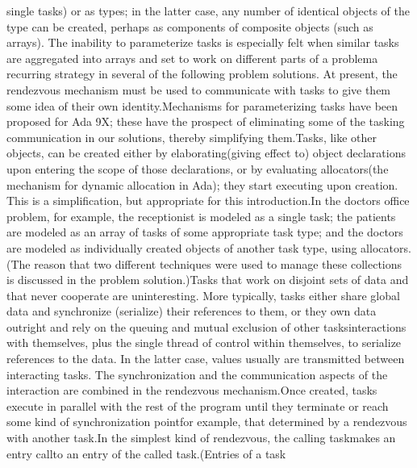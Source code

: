 \txtxemph[]single tasks\txtxendemph[]) or as types; in the latter
case, any number of identical objects of the type can be created,
perhaps as components of composite objects (such as arrays).%
\NtFoot[]\NtNtpar[]The inability to parameterize tasks is especially
felt when similar tasks are aggregated into arrays and set to work
on different parts of a problem\EmDash[]a recurring strategy in several
of the following problem solutions. At present, the rendezvous mechanism
must be used to communicate with tasks to give them some idea of their
own \ldquo[]identity.\rdquo[] Mechanisms for parameterizing tasks
have been proposed for Ada 9X; these have the prospect of eliminating
some of the tasking communication in our solutions, thereby simplifying
them.\NtEndntpar[]\NtEndfoot[] Tasks, like other objects, can be created
either by \txtxemph[]elaborating\txtxendemph[] (giving effect to)
object declarations upon entering the scope of those declarations,
or by evaluating \txtxemph[]allocators\txtxendemph[] (the mechanism
for dynamic allocation in Ada); they start executing upon creation.%
\NtFoot[]\NtNtpar[]This is a simplification, but appropriate for this
introduction.\NtEndntpar[]\NtEndfoot[] In the doctor\rsquo[]s office
problem, for example, the receptionist is modeled as a single task;
the patients are modeled as an array of tasks of some appropriate
task type; and the doctors are modeled as individually created objects
of another task type, using allocators. (The reason that two different
techniques were used to manage these collections is discussed in the
problem solution.)\Endpara[]
\Para[]Tasks that work on disjoint sets of data and that never cooperate
are uninteresting. More typically, tasks either share global data
and synchronize (serialize) their references to them, or they own
data outright and rely on the queuing and mutual exclusion of other
tasks\rsquo[] interactions with themselves, plus the single thread
of control within themselves, to serialize references to the data.
In the latter case, values usually are transmitted between interacting
tasks. The synchronization and the communication aspects of the interaction
are combined in the rendezvous mechanism.\Endpara[]
\Para[]Once created, tasks execute in parallel with the rest of the
program until they terminate or reach some kind of synchronization
point\EmDash[]for example, that determined by a rendezvous with another
task.\Endpara[]
\Para[]In the simplest kind of rendezvous, the \ldquo[]calling task\rdquo[]
makes an \txtxemph[]entry call\txtxendemph[] to an \txtxemph[]entry%
\txtxendemph[] of the \ldquo[]called task.\rdquo[] (Entries of a task
